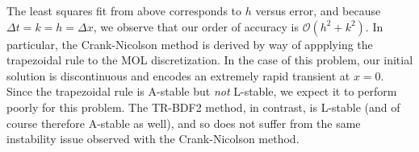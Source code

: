 \begin{solution}
    The least squares fit from above corresponds to $h$ versus error, and because \linebreak
    $\Delta t = k = h = \Delta x$, we observe that our order of accuracy is $\mathcal{O}\left(h^2 + k^2\right)$. In
    particular, the Crank-Nicolson method is derived by way of appplying the trapezoidal rule to the MOL discretization.
    In the case of this problem, our initial solution is discontinuous and encodes an extremely rapid transient at
    $x = 0$. Since the trapezoidal rule is A-stable but \textit{not} L-stable, we expect it to perform poorly for this
    problem. The TR-BDF2 method, in contrast, is L-stable (and of course therefore A-stable as well), and so does not
    suffer from the same instability issue observed with the Crank-Nicolson method.
    \ \\
\end{solution}